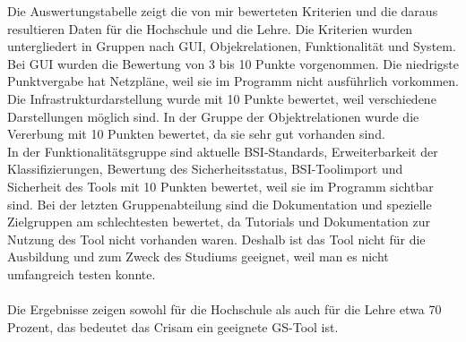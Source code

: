 Die Auswertungstabelle zeigt die von mir bewerteten Kriterien und die daraus resultieren Daten für die Hochschule und die Lehre. 
Die Kriterien wurden untergliedert in Gruppen nach GUI, Objekrelationen, Funktionalität und System.
\\
Bei GUI wurden die Bewertung von 3 bis 10 Punkte vorgenommen. 
Die niedrigste Punktvergabe hat Netzpläne, weil sie im Programm nicht ausführlich vorkommen.
\\
Die Infrastrukturdarstellung wurde mit 10 Punkte bewertet, weil verschiedene Darstellungen möglich sind.
In der Gruppe der Objektrelationen wurde die Vererbung mit 10 Punkten bewertet, da sie sehr gut vorhanden sind.
\\
In der Funktionalitätsgruppe sind aktuelle BSI-Standards, Erweiterbarkeit der Klassifizierungen, Bewertung des Sicherheitsstatus, BSI-Toolimport und Sicherheit des Tools mit 10 Punkten bewertet, weil sie im Programm sichtbar sind.
Bei der letzten Gruppenabteilung sind die Dokumentation und spezielle Zielgruppen am schlechtesten bewertet, da Tutorials und Dokumentation zur Nutzung des Tool nicht vorhanden waren. Deshalb ist das Tool nicht für die Ausbildung und zum Zweck des Studiums geeignet, weil man es nicht umfangreich testen konnte.
\\
\\
Die Ergebnisse zeigen sowohl für die Hochschule als auch für die Lehre etwa 70 Prozent, das bedeutet das Crisam ein geeignete GS-Tool ist.
